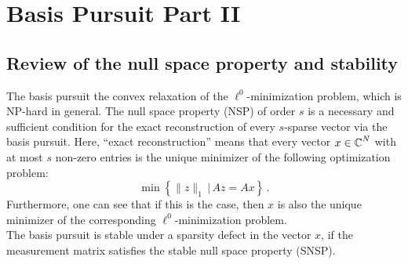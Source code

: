 \documentclass[a4paper]{article}
\begin{document}
\section*{Basis Pursuit Part II}

\subsection*{Review of the null space property and stability}
The basis pursuit the convex relaxation of the \(\ell^0\)-minimization problem, which is NP-hard in general.
The null space property (NSP) of order \(s\) is a necessary and sufficient condition for the exact reconstruction of every \(s\)-sparse vector via the basis pursuit. Here, \enquote{exact reconstruction} means that every vector \(x\in\operatorname{\mathbb C}^N\) with at most \(s\) non-zero entries is the unique minimizer of the following optimization problem:
\[
    \min\left\{\|z\|_1\,|\,
    Az=Ax\right\}\,.\]
 Furthermore, one can see that if this is the case, then \(x\) is also the unique minimizer of the corresponding \(\ell^0\)-minimization problem.\\
 The basis pursuit is stable under a sparsity defect in the vector \(x\), if the measurement matrix satisfies the stable null space property (SNSP).
\end{document}
